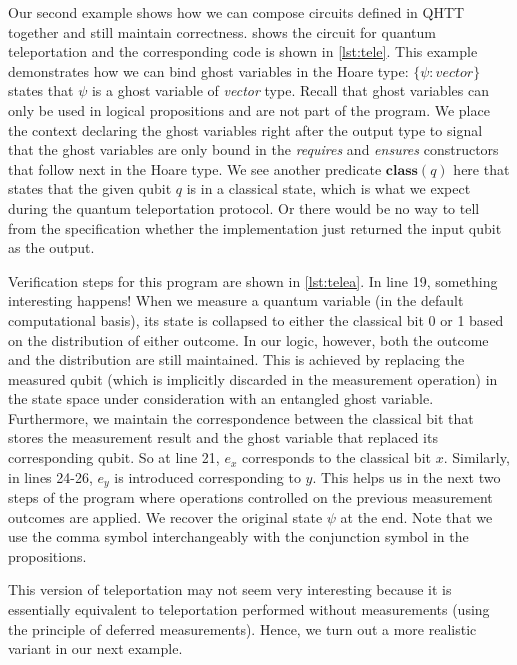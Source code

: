 \documentclass[adraft,creativecommons]{eptcs}
\theoremstyle{definition}
\theoremstyle{remark}
\begin{document}
Our second example shows how we can compose circuits defined in QHTT together and still maintain correctness.  shows the circuit for quantum teleportation and the corresponding code is shown in \cref{lst:tele}. This example demonstrates how we can bind ghost variables in the Hoare type: $\{\psi: \mathit{vector}\}$ states that $\psi$ is a ghost variable of \textit{vector} type. Recall that ghost variables can only be used in logical propositions and are not part of the program. We place the context declaring the ghost variables right after the output type to signal that the ghost variables are only bound in the \textit{requires} and \textit{ensures} constructors that follow next in the Hoare type. We see another predicate $\mathbf{class}(q)$ here that states that the given qubit $q$ is in a classical state, which is what we expect during the quantum teleportation protocol. Or there would be no way to tell from the specification whether the implementation just returned the input qubit as the output.





Verification steps for this program are shown in \cref{lst:telea}. In line 19, something interesting happens! When we measure a quantum variable (in the default computational basis), its state is collapsed to either the classical bit 0 or 1 based on the distribution of either outcome. In our logic, however, both the outcome and the distribution are still maintained. This is achieved by replacing the measured qubit (which is implicitly discarded in the measurement operation) in the state space under consideration with an entangled ghost variable. Furthermore, we maintain the correspondence between the classical bit that stores the measurement result and the ghost variable that replaced its corresponding qubit. So at line 21, $e_x$ corresponds to the classical bit $x$. Similarly, in lines 24-26, $e_y$ is introduced corresponding to $y$. This helps us in the next two steps of the program where operations controlled on the previous measurement outcomes are applied. We recover the original state $\psi$ at the end. Note that we use the comma symbol interchangeably with the conjunction symbol in the propositions.

This version of teleportation may not seem very interesting because it is essentially equivalent to teleportation performed without measurements (using the principle of deferred measurements). Hence, we turn out a more realistic variant in our next example.
\end{document}
